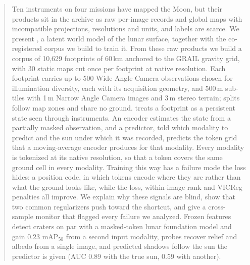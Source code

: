 \begin{abstract}
Ten instruments on four missions have mapped the Moon, but their products sit in the archive as raw per-image records and global maps with incompatible projections, resolutions and units, and labels are scarce. We present \method, a latent world model of the lunar surface, together with the co-registered corpus we build to train it. From these raw products we build a corpus of 10,629 footprints of 60\,km anchored to the GRAIL gravity grid, with 30 static maps cut once per footprint at native resolution. Each footprint carries up to 500 Wide Angle Camera observations chosen for illumination diversity, each with its acquisition geometry, and 500\,m sub-tiles with 1\,m Narrow Angle Camera images and 3\,m stereo terrain; splits follow map zones and share no ground. \method treats a footprint as a persistent state seen through instruments. An encoder estimates the state from a partially masked observation, and a predictor, told which modality to predict and the sun under which it was recorded, predicts the token grid that a moving-average encoder produces for that modality. Every modality is tokenized at its native resolution, so that a token covers the same ground cell in every modality. Training this way has a failure mode the loss hides: a position code, in which tokens encode where they are rather than what the ground looks like, while the loss, within-image rank and VICReg penalties all improve. We explain why these signals are blind, show that two common regularizers push toward the shortcut, and give a cross-sample monitor that flagged every failure we analyzed. Frozen \method features detect craters on par with a masked-token lunar foundation model and gain 0.23 mAP$_{50}$ from a second input modality, probes recover relief and albedo from a single image, and predicted shadows follow the sun the predictor is given (AUC 0.89 with the true sun, 0.59 with another).
\end{abstract}
